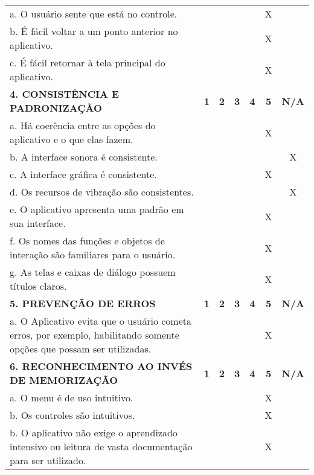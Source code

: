 \documentclass[portuguese,oneside]{tcc}
\begin{document}
\begin{center}
\begin{longtabu}{|L{25em}|c|c|c|c|c|c|}
																												a. O usuário sente que está no controle. & & & & & X & \\ 
																												b. É fácil voltar a um ponto anterior no aplicativo. & & & & & X & \\ 
																												c. É fácil retornar à tela principal do aplicativo. & & & & & X & \\ 
																												\textbf{4. CONSISTÊNCIA E PADRONIZAÇÃO} & \textbf{1} & \textbf{2} & \textbf{3} & \textbf{4} & \textbf{5} & \textbf{N/A} \\ 
																												a. Há coerência entre as opções do aplicativo e o que elas fazem. & & & & & X & \\ 
																												b. A interface sonora é consistente. & & & & & & X \\ 
																												c. A interface gráfica é consistente. & & & & & X & \\ 
																												d. Os recursos de vibração são consistentes. & & & & & & X \\ 
																												e. O aplicativo apresenta uma padrão em sua interface. & & & & & X & \\ 
																												f. Os nomes das funções e objetos de interação são familiares para o usuário. & & & & & X & \\ 
																												g. As telas e caixas de diálogo possuem títulos claros. & & & & & X & \\ 
																												\textbf{5. PREVENÇÃO DE ERROS} & \textbf{1} & \textbf{2} & \textbf{3} & \textbf{4} & \textbf{5} & \textbf{N/A} \\ 
																												a. O Aplicativo evita que o usuário cometa erros, por exemplo, habilitando somente opções que possam ser utilizadas. & & & & & X & \\ 
																												\textbf{6. RECONHECIMENTO AO INVÉS DE MEMORIZAÇÃO} & \textbf{1} & \textbf{2} & \textbf{3} & \textbf{4} & \textbf{5} & \textbf{N/A} \\ 
																												a. O  menu é de uso intuitivo. & & & & & X & \\ 
																												b. Os controles são intuitivos. & & & & & X & \\ 
																												b. O aplicativo não exige o aprendizado intensivo ou leitura de vasta documentação para ser utilizado. & & & & & X & \\ 

\end{longtabu}
\end{center}
\end{document}
